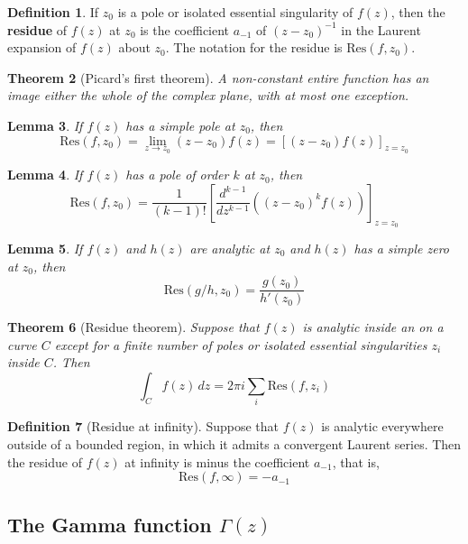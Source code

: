 \documentclass[10pt, oneside, reqno]{amsart}
\theoremstyle{plain}%
\newtheorem{thm}{Theorem}[section]
\newtheorem{lem}[thm]{Lemma}
\theoremstyle{definition}
\newtheorem{defn}[thm]{Definition}
\theoremstyle{remark}
\newcommand{\dzz}{\, dz}
\newcommand{\res}[2]{\text{Res}(#1,#2)}
\begin{document}
\begin{defn}
    If $z_0$ is a pole or isolated essential singularity of $f(z)$, then the \textbf{residue} of $f(z)$ at $z_0$ is the coefficient $a_{-1}$ of $(z-z_0)^{-1}$ in the Laurent expansion of $f(z)$ about $z_0$.  The notation for the residue is $\res{f}{z_0}$.
\end{defn}

\begin{thm}[Picard's first theorem]
    A non-constant entire function has an image either the whole of the complex plane, with at most one exception.
\end{thm}

\begin{lem}
    If $f(z)$ has a simple pole at $z_0$, then \[
        \res{f}{z_0} = \lim_{z \rightarrow z_0} (z - z_0) f(z) = \left[(z-z_0) f(z) \right]_{z = z_0}
    \]
\end{lem}

\begin{lem}
    If $f(z)$ has a pole of order $k$ at $z_0$, then \[
        \res{f}{z_0} = \frac{1}{(k-1)!}\left[\frac{d^{k-1}}{dz^{k-1}} \left((z-z_0)^k f(z)\right) \right]_{z = z_0}
    \]
\end{lem}

\begin{lem}
    If $f(z)$ and $h(z)$ are analytic at $z_0$ and $h(z)$ has a simple zero at $z_0$, then \[
        \res{g/h}{z_0} = \frac{g(z_0)}{h'(z_0)}
    \]
\end{lem}


\begin{thm}[Residue theorem]
    Suppose that $f(z)$ is analytic inside an on a curve $C$ except for a finite number of poles or isolated essential singularities $z_i$ inside $C$.  Then \[
        \int_C f(z) \dzz = 2 \pi i \sum_{i} \res{f}{z_i}
    \]
\end{thm}

\begin{defn}[Residue at infinity]
    Suppose that $f(z)$ is analytic everywhere outside of a bounded region, in which it admits a convergent Laurent series.  Then the residue of $f(z)$ at infinity is minus the coefficient $a_{-1}$, that is,\[
        \res{f}{\infty} = -a_{-1}
    \]
\end{defn}




\subsection{The Gamma function $\Gamma(z)$} %
\label{sec:the_gamma_function_gamma_z_}
\end{document}

